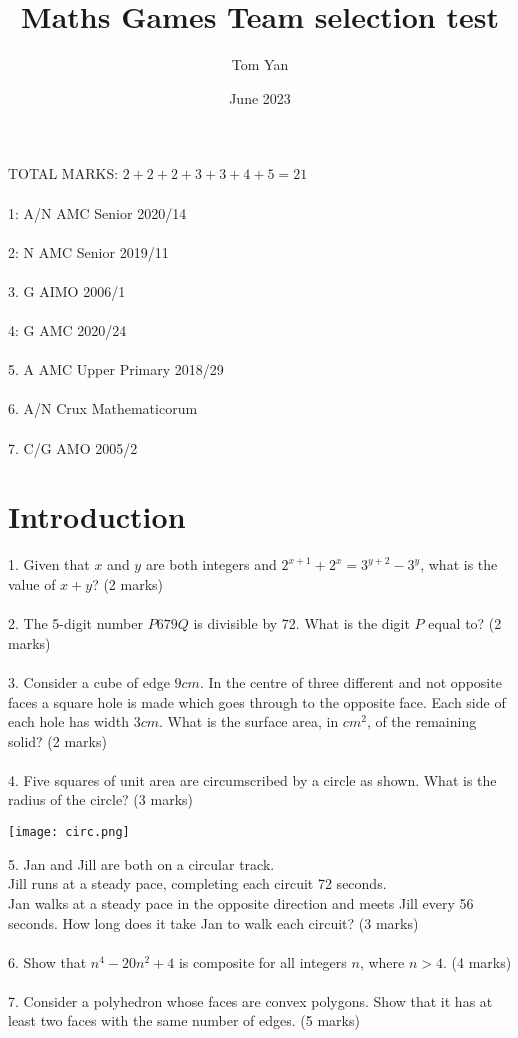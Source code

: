 \documentclass{article}
\title{Maths Games Team selection test}
\author{Tom Yan}
\date{June 2023}
\begin{document}
\maketitle
TOTAL MARKS: $2 + 2 + 2 + 3 + 3 + 4 + 5 = 21$ \\\\
1: A/N  AMC Senior 2020/14\\\\ 2: N AMC Senior 2019/11\\\\3. G AIMO 2006/1 \\\\ 4: G AMC 2020/24  \\\\5. A AMC Upper Primary 2018/29 \\\\ 6. A/N Crux Mathematicorum \\\\7. C/G AMO 2005/2
\newpage
\section{Introduction}
1. Given that $x$ and $y$ are both integers and $2^{x+1}+2^x=3^{y+2}-3^y$, what is the value of $x+y$? (2 marks) \\\\ 2. The 5-digit number $P679Q$ is divisible by 72. What is the digit $P$ equal to? (2 marks) \\\\ 3. Consider a cube of edge $9cm$. In the centre of three different and not opposite faces a square hole is made which goes through to the opposite face. Each side of each hole has width $3cm$. What is the surface area, in $cm^2$, of the remaining solid? (2 marks) \\\\
4. Five squares of unit area are circumscribed by a circle as shown. What is the radius of the circle? (3 marks) \\ 
\centerline{\texttt{[image: circ.png]}}
5. Jan and Jill are both on a circular track. \\ Jill runs at a steady pace, completing each circuit 72 seconds. \\ Jan walks at a steady pace in the opposite direction and meets Jill every 56 seconds. How long does it take Jan to walk each circuit? (3 marks)\\\\
6. Show that $n^4-20n^2+4$ is composite for all integers $n$, where $n>4$. (4 marks)  \\\\
7. Consider a polyhedron whose faces are convex polygons. Show that it has at least two faces with the same number of edges. (5 marks)\\\\
\end{document}
